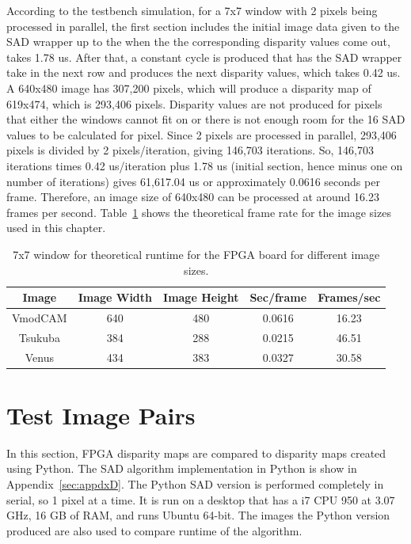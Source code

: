 According to the testbench simulation, for a 7x7 window with 2 pixels being processed in parallel, the first section includes the initial image data given to the SAD wrapper up to the when the the corresponding disparity values come out, takes 1.78 us. After that, a constant cycle is produced that has the SAD wrapper take in the next row and produces the next disparity values, which takes 0.42 us. A 640x480 image has 307,200 pixels, which will produce a disparity map of 619x474, which is 293,406 pixels. Disparity values are not produced for pixels that either the windows cannot fit on or there is not enough room for the 16 SAD values to be calculated for pixel. Since 2 pixels are processed in parallel, 293,406 pixels is divided by 2 pixels/iteration, giving 146,703 iterations. So, 146,703 iterations times 0.42 us/iteration plus 1.78 us (initial section, hence minus one on number of iterations) gives 61,617.04 us or approximately 0.0616 seconds per frame. Therefore, an image size of 640x480 can be processed at around 16.23 frames per second. Table~\ref{table:tb_7x7} shows the theoretical frame rate for the image sizes used in this chapter.


\begin{table}
	\begin{center}
		\begin{tabular}{|c|c|c|c|c|}
			\hline
				\rowstyle{\bfseries} Image & 
				\rowstyle{\bfseries} Image Width & 
				\rowstyle{\bfseries} Image Height & 
				\rowstyle{\bfseries} Sec/frame & 
				\rowstyle{\bfseries} Frames/sec
			\\ \hline 
			VmodCAM & 640 & 480 & 0.0616 & 16.23
			\\ \hline 
			Tsukuba & 384 & 288 & 0.0215 & 46.51
			\\ \hline 
			Venus & 434 & 383 & 0.0327 & 30.58
			\\ \hline 
		\end{tabular}	
		\captionfonts
		\caption{7x7 window for theoretical runtime for the FPGA board for different image sizes.}
		\label{table:tb_7x7}
	\end{center}
\end{table}

\section{Test Image Pairs}
\label{sec:runtime}

In this section, FPGA disparity maps are compared to disparity maps created using Python. The SAD algorithm implementation in Python is show in Appendix~\ref{sec:appdxD}. The Python SAD version is performed completely in serial, so 1 pixel at a time. It is run on a desktop that has a i7 CPU 950 at 3.07 GHz, 16 GB of RAM, and runs Ubuntu 64-bit. The images the Python version produced are also used to compare runtime of the algorithm.

